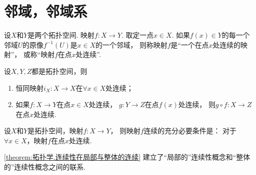 \section{邻域，邻域系}

\begin{definition}
设\(X\)和\(Y\)是两个拓扑空间.
映射\(f\colon X \to Y\).
取定一点\(x \in X\).
如果\(f(x) \in Y\)的每一个邻域\(U\)的原像\(f^{-1}(U)\)是\(x \in X\)的一个邻域，
则称映射\(f\)是“一个在点\(x\)处连续的映射”，
或称“映射\(f\)在点\(x\)处连续”.
\end{definition}

\begin{theorem}
设\(X,Y,Z\)都是拓扑空间，则
\begin{enumerate}
	\item 恒同映射\(i_X\colon X \to X\)在\(\forall x \in X\)处连续；
	\item 如果\(f\colon X \to Y\)在点\(x \in X\)处连续，
	\(g\colon Y \to Z\)在点\(f(x)\)处连续，
	则\(g \circ f\colon X \to Z\)在点\(x\)处连续.
\end{enumerate}
\end{theorem}

\begin{theorem}\label{theorem:拓扑学.连续性在局部与整体的连续}
设\(X\)和\(Y\)是拓扑空间，映射\(f\colon X \to Y\)，
则映射\(f\)连续的充分必要条件是：
对于\(\forall x \in X\)，映射\(f\)在点\(x\)处连续.
\end{theorem}

\cref{theorem:拓扑学.连续性在局部与整体的连续}
建立了“局部的”连续性概念和“整体的”连续性概念之间的联系.
